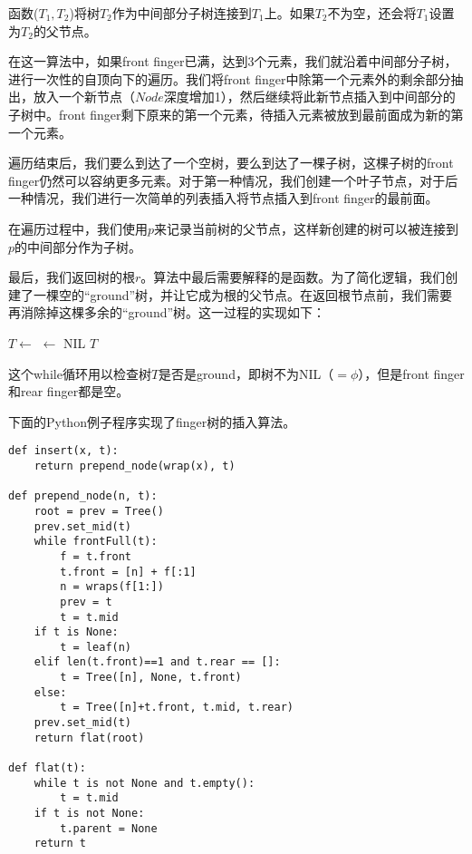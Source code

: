 \documentclass[UTF8]{article}
\begin{document}
函数($T_1, T_2$)将树$T_2$作为中间部分子树连接到$T_1$上。如果$T_2$不为空，还会将$T_1$设置为$T_2$的父节点。

在这一算法中，如果front finger已满，达到3个元素，我们就沿着中间部分子树，进行一次性的自顶向下的遍历。我们将front finger中除第一个元素外的剩余部分抽出，放入一个新节点（$Node$深度增加1），然后继续将此新节点插入到中间部分的子树中。front finger剩下原来的第一个元素，待插入元素被放到最前面成为新的第一个元素。

遍历结束后，我们要么到达了一个空树，要么到达了一棵子树，这棵子树的front finger仍然可以容纳更多元素。对于第一种情况，我们创建一个叶子节点，对于后一种情况，我们进行一次简单的列表插入将节点插入到front finger的最前面。

在遍历过程中，我们使用$p$来记录当前树的父节点，这样新创建的树可以被连接到$p$的中间部分作为子树。

最后，我们返回树的根$r$。算法中最后需要解释的是函数。为了简化逻辑，我们创建了一棵空的“ground”树，并让它成为根的父节点。在返回根节点前，我们需要再消除掉这棵多余的“ground”树。这一过程的实现如下：

\begin{algorithmic}
    \State $T \gets$ 
  \EndWhile
    \State {} $\gets $ NIL
  \EndIf
  \State \Return $T$
\EndFunction
\end{algorithmic}

这个while循环用以检查树$T$是否是ground，即树不为NIL（$=\phi$），但是front finger和rear finger都是空。

下面的Python例子程序实现了finger树的插入算法。

\lstset{language=Python}
\begin{lstlisting}
def insert(x, t):
    return prepend_node(wrap(x), t)

def prepend_node(n, t):
    root = prev = Tree()
    prev.set_mid(t)
    while frontFull(t):
        f = t.front
        t.front = [n] + f[:1]
        n = wraps(f[1:])
        prev = t
        t = t.mid
    if t is None:
        t = leaf(n)
    elif len(t.front)==1 and t.rear == []:
        t = Tree([n], None, t.front)
    else:
        t = Tree([n]+t.front, t.mid, t.rear)
    prev.set_mid(t)
    return flat(root)

def flat(t):
    while t is not None and t.empty():
        t = t.mid
    if t is not None:
        t.parent = None
    return t
\end{lstlisting}
\end{document}
